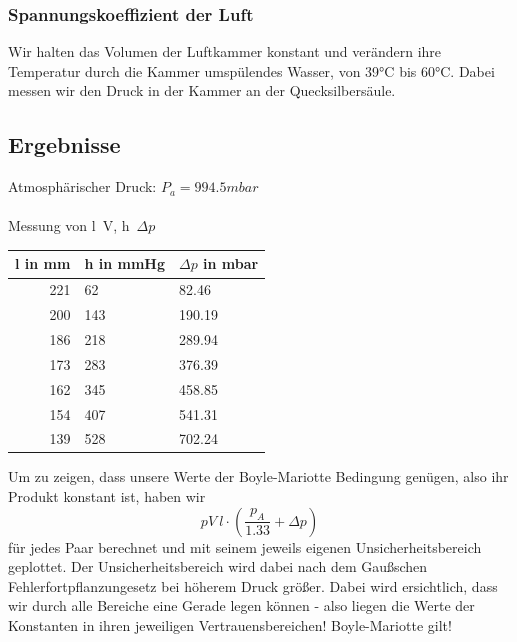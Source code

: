 \documentclass{article}
\begin{document}
\subsubsection*{Spannungskoeffizient der Luft}
Wir halten das Volumen der Luftkammer konstant und verändern ihre Temperatur durch die Kammer umspülendes Wasser, von 39°C bis 60°C. Dabei messen wir den Druck in der Kammer an der Quecksilbersäule. 


\subsection{Ergebnisse}
Atmosphärischer Druck: $P_a=994.5mbar$\\
\\
Messung von l~V, h~$\Delta p$
\begin{center}
\begin{tabular}{r|l|l}
l in mm & h in mmHg & $\Delta p$ in mbar\\
\hline
221 & 62 & 82.46\\
200 & 143 & 190.19\\
186 & 218 & 289.94\\
173 & 283 & 376.39\\
162 & 345 & 458.85\\
154 & 407 & 541.31\\
139 & 528 & 702.24\\
\end{tabular}
\end{center}
Um zu zeigen, dass unsere Werte der Boyle-Mariotte Bedingung genügen, also ihr Produkt konstant ist, haben wir $$pV~l\cdot (\frac{p_A}{1.33}+\Delta p)$$ für jedes Paar berechnet und mit seinem jeweils eigenen Unsicherheitsbereich geplottet. Der Unsicherheitsbereich wird dabei nach dem Gaußschen Fehlerfortpflanzungesetz bei höherem Druck größer. Dabei wird ersichtlich, dass wir durch alle Bereiche eine Gerade legen können - also liegen die Werte der Konstanten in ihren jeweiligen Vertrauensbereichen! Boyle-Mariotte gilt!\\
\end{document}
